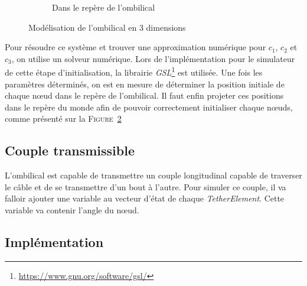 \begin{figure}[!htb]
\begin{subfigure}[b]{0.45\textwidth}
						\caption{Dans le repère de l'ombilical}
						\label{fig:2d_plot}
					\end{subfigure}
					\caption{Modélisation de l'ombilical en 3 dimensions}
					\label{fig:tether_plot}
				\end{figure}
				
				Pour résoudre ce système et trouver une approximation numérique pour $c_1$, $c_2$ et $c_3$, on utilise un solveur numérique. Lors de l'implémentation pour le simulateur de cette étape d'initialisation, la librairie \textit{GSL}\footnote{\url{https://www.gnu.org/software/gsl/}} est utilisée. Une fois les paramètres déterminés, on est en mesure de déterminer la position initiale de chaque n\oe ud dans le repère de l'ombilical. Il faut enfin projeter ces positions dans le repère du monde afin de pouvoir correctement initialiser chaque n\oe uds, comme présenté sur la \textsc{Figure}~\ref{fig:tether_plot}
			
			\subsection{Couple transmissible}

				L'ombilical est capable de transmettre un couple longitudinal capable de traverser le câble et de se transmettre d'un bout à l'autre. Pour simuler ce couple, il va falloir ajouter une variable au vecteur d'état de chaque \textit{TetherElement}. Cette variable va contenir l'angle du n\oe ud.

			\subsection{Implémentation}

